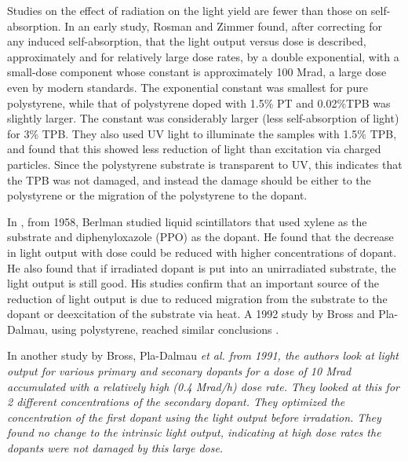 Studies on the effect of radiation on the light yield are fewer
than those on self-absorption.
In an early study, Rosman and Zimmer found, after correcting
for any induced self-absorption, that the light
output versus dose is described,
approximately and for relatively large dose rates, by a double exponential, 
with a small-dose component whose constant is approximately 100 Mrad,
a large dose even by modern standards.
The exponential constant was smallest for pure polystyrene, while
that of polystyrene doped with 1.5\% PT  and 0.02\%TPB
was slightly larger.  The constant was considerably larger (less
self-absorption of light) for 3\% TPB.  They also used UV light to illuminate
the samples with 1.5\% TPB, and found that this showed less
reduction of light than excitation via charged particles.
Since the polystyrene substrate is transparent to UV, this
indicates that the TPB was not damaged, and instead the damage
should be either to the polystyrene or the migration of the polystyrene
to the dopant.

In \cite{berlman}, from 1958, Berlman studied liquid scintillators
that used xylene as the substrate and diphenyloxazole (PPO) as the dopant.
He found that the decrease in light output with dose could be
reduced with higher concentrations of dopant.  He also found
that if irradiated dopant is put into an unirradiated substrate,
the light output is still good.  His studies
confirm that
an important source of the reduction of light output is due to
reduced migration from the substrate 
to the dopant or deexcitation of the substrate via heat.
A 1992 study by Bross and Pla-Dalmau, using polystyrene,
reached similar conclusions \cite{173178}.

In another study by Bross, Pla-Dalmau \it{et al.} from 1991, the authors look at light output for various primary and seconary dopants for a dose of 10 Mrad accumulated with a relatively high (0.4 Mrad/h) dose rate.  They looked at this for 2 different concentrations of the secondary dopant.  They optimized the concentration of the first dopant using the light output before irradation.  They found no change to the intrinsic light output, indicating at high dose rates the dopants were
not damaged by this large dose.  


